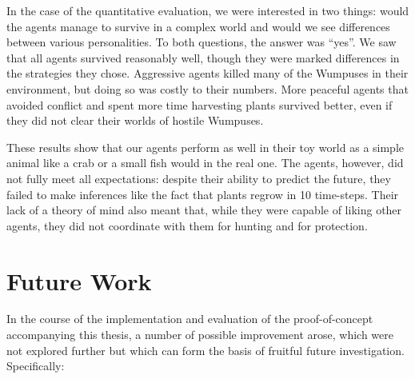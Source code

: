 In the case of the quantitative evaluation, we were interested in two things: would the agents manage to survive in a complex world and would we see differences between various personalities. To both questions, the answer was ``yes''. We saw that all agents survived reasonably well, though they were marked differences in the strategies they chose. Aggressive agents killed many of the Wumpuses in their environment, but doing so was costly to their numbers. More peaceful agents that avoided conflict and spent more time harvesting plants survived better, even if they did not clear their worlds of hostile Wumpuses.

These results show that our agents perform as well in their toy world as a simple animal like a crab or a small fish would in the real one. The agents, however, did not fully meet all expectations: despite their ability to predict the future, they failed to make inferences like the fact that plants regrow in 10 time-steps. Their lack of a theory of mind also meant that, while they were capable of liking other agents, they did not coordinate with them for hunting and for protection.

\section{Future Work}\label{sec:futureWork}

In the course of the implementation and evaluation of the proof-of-concept accompanying this thesis, a number of possible improvement arose, which were not explored further but which can form the basis of fruitful future investigation. Specifically:

